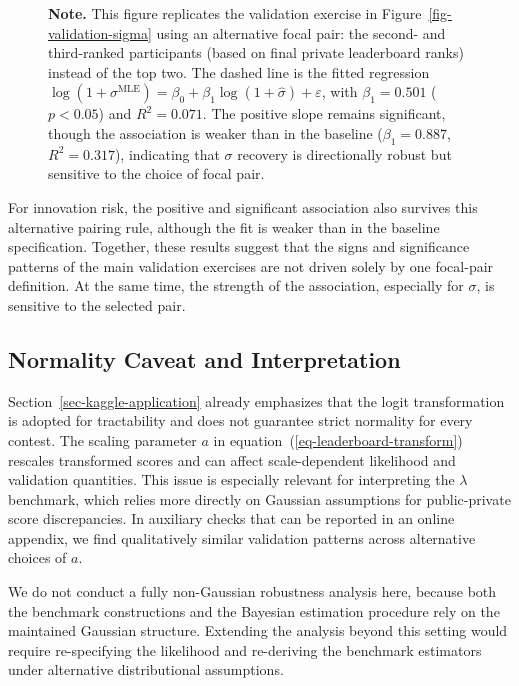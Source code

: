 \documentclass[mnsc]{informs3}
\begin{document}
\begin{figure}[tbp]
\begin{minipage}{\textwidth}
{\footnotesize
\textbf{Note.} This figure replicates the validation exercise in Figure~\ref{fig-validation-sigma} using an alternative focal pair: the second- and third-ranked participants (based on final private leaderboard ranks) instead of the top two. The dashed line is the fitted regression $\log(1 + \sigma^{\mathrm{MLE}}) = \beta_0 + \beta_1 \log(1 + \hat{\sigma}) + \varepsilon$, with $\beta_1 = 0.501$ ($p < 0.05$) and $R^2 = 0.071$. The positive slope remains significant, though the association is weaker than in the baseline ($\beta_1 = 0.887$, $R^2 = 0.317$), indicating that $\sigma$ recovery is directionally robust but sensitive to the choice of focal pair.
}
\end{minipage}
\end{figure}

For innovation risk, the positive and significant association also survives this alternative pairing rule, although the fit is weaker than in the baseline specification.
Together, these results suggest that the signs and significance patterns of the main validation exercises are not driven solely by one focal-pair definition. At the same time, the strength of the association, especially for $\sigma$, is sensitive to the selected pair.


\subsection{Normality Caveat and Interpretation}\label{sect-robust-normality}

Section~\ref{sec-kaggle-application} already emphasizes that the logit transformation is adopted for tractability and does not guarantee strict normality for every contest.
The scaling parameter $a$ in equation~(\ref{eq-leaderboard-transform}) rescales transformed scores and can affect scale-dependent likelihood and validation quantities.
This issue is especially relevant for interpreting the $\lambda$ benchmark, which relies more directly on Gaussian assumptions for public-private score discrepancies.
In auxiliary checks that can be reported in an online appendix, we find qualitatively similar validation patterns across alternative choices of $a$.

We do not conduct a fully non-Gaussian robustness analysis here, because both the benchmark constructions and the Bayesian estimation procedure rely on the maintained Gaussian structure.
Extending the analysis beyond this setting would require re-specifying the likelihood and re-deriving the benchmark estimators under alternative distributional assumptions.
\end{document}
